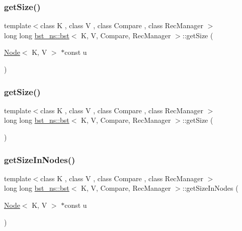 \subsubsection{\texorpdfstring{get\+Size()}{getSize()}\hspace{0.1cm}{\footnotesize\ttfamily [1/2]}}
{\footnotesize\ttfamily template$<$class K , class V , class Compare , class Rec\+Manager $>$ \\
long long \hyperlink{classbst__ns_1_1bst}{bst\+\_\+ns\+::bst}$<$ K, V, Compare, Rec\+Manager $>$\+::get\+Size (\begin{DoxyParamCaption}\item[{\hyperlink{classbst__ns_1_1Node}{Node}$<$ K, V $>$ $\ast$const}]{u }\end{DoxyParamCaption})\hspace{0.3cm}{\ttfamily [inline]}}

\mbox{\label{classbst__ns_1_1bst_aebafe1df3868581c45cc7ea3a418ba55}} 
\subsubsection{\texorpdfstring{get\+Size()}{getSize()}\hspace{0.1cm}{\footnotesize\ttfamily [2/2]}}
{\footnotesize\ttfamily template$<$class K , class V , class Compare , class Rec\+Manager $>$ \\
long long \hyperlink{classbst__ns_1_1bst}{bst\+\_\+ns\+::bst}$<$ K, V, Compare, Rec\+Manager $>$\+::get\+Size (\begin{DoxyParamCaption}{ }\end{DoxyParamCaption})\hspace{0.3cm}{\ttfamily [inline]}}

\mbox{\label{classbst__ns_1_1bst_adf543c23e8a49408bb85f9421a4bcef8}} 
\subsubsection{\texorpdfstring{get\+Size\+In\+Nodes()}{getSizeInNodes()}\hspace{0.1cm}{\footnotesize\ttfamily [1/2]}}
{\footnotesize\ttfamily template$<$class K , class V , class Compare , class Rec\+Manager $>$ \\
long long \hyperlink{classbst__ns_1_1bst}{bst\+\_\+ns\+::bst}$<$ K, V, Compare, Rec\+Manager $>$\+::get\+Size\+In\+Nodes (\begin{DoxyParamCaption}\item[{\hyperlink{classbst__ns_1_1Node}{Node}$<$ K, V $>$ $\ast$const}]{u }\end{DoxyParamCaption})\hspace{0.3cm}{\ttfamily [inline]}}

